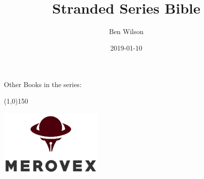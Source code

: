 \documentclass[11pt,twoside,makeidx,hidelinks,]{memoir}
\title{Stranded Series Bible}
\author{Ben Wilson}
\date{2019-01-10}
\def\seriespage{\thispagestyle{empty}
\begin{center}
  \noindent{\large\theseriestitle}
  \vskip10.5pt
  \noindent Other Books in the series:
  \vskip4pt
  \theseriesbooks
\end{center}\cleardoublepage}
\begin{document}
\frontmatter
  \begin{titlingpage}
    \pagestyle{empty}
    \begin{center}
    \vspace*{2in}

    \Huge\textbf{\textsf\thetitle}

    \vspace*{0.75in}

    \Large\textsf\theauthor

    \vspace*{\fill}
    \end{center}
  \end{titlingpage}

  \seriespage
 \newpage
  \begin{titlingpage}
    \pagestyle{empty}
    \begin{center}
    \vspace*{\fill}

    \HUGE\textbf{\textsf\thetitle}

    \vspace*{0.25in}
    \line(1,0){150}
    \vspace*{0.25in}

    \Large\textsf\theauthor

    \vspace*{\fill}

    \vspace*{\fill}
    \includegraphics[width=2in]{_images/logo.png}\\[0cm]
    \end{center}
  \end{titlingpage}

  \vspace*{\fill}
  \pagestyle{empty}

  \par\noindent\emph{\thetitle}
  \newline
\end{document}
